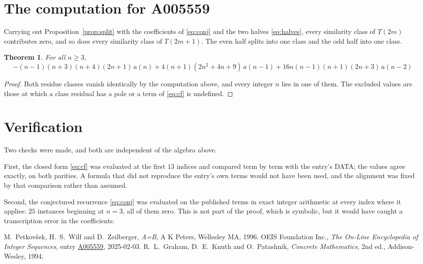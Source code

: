 \documentclass[11pt,a4paper]{article}
\theoremstyle{plain}
\newtheorem{theorem}{Theorem}
\theoremstyle{definition}
\begin{document}
\section{The computation for A005559}

Carrying out Proposition~\ref{prop:split} with the coefficients of \eqref{eq:conj} and the
two halves \eqref{eq:halves}, every similarity class of $T(2m)$ contributes zero, and so
does every similarity class of $T(2m+1)$. The even half splits into one class
and the odd half into one class.

\begin{theorem}
For all $n\ge 3$,
\[
- \left(n - 1\right) \left(n + 3\right) \left(n + 4\right) \left(2 n + 1\right)\,a(n) + 4 \left(n + 1\right) \left(2 n^{2} + 4 n + 9\right)\,a(n-1) + 16 n \left(n - 1\right) \left(n + 1\right) \left(2 n + 3\right)\,a(n-2)
\]
\end{theorem}

\begin{proof}
Both residue classes vanish identically by the computation above, and every integer $n$
lies in one of them. The excluded values are those at which a class residual has a pole or
a term of \eqref{eq:cf} is undefined.
\end{proof}

\section{Verification}

Two checks were made, and both are independent of the algebra above.

First, the closed form \eqref{eq:cf} was evaluated at the first $13$ indices and
compared term by term with the entry's DATA; the values agree exactly, on both parities. A
formula that did not reproduce the entry's own terms would not have been used, and the
alignment was fixed by that comparison rather than assumed.

Second, the conjectured recurrence \eqref{eq:conj} was evaluated on the published terms in
exact integer arithmetic at every index where it applies: $25$ instances beginning at
$n=3$, all of them zero. This is not part of the proof, which is symbolic, but it
would have caught a transcription error in the coefficients.

\begin{thebibliography}{9}
 M.~Petkov\v{s}ek, H.~S.~Wilf and D.~Zeilberger, \emph{A=B}, A K Peters,
Wellesley MA, 1996.
 OEIS Foundation Inc., \emph{The On-Line Encyclopedia of Integer Sequences},
entry \href{https://oeis.org/A005559}{A005559}, 2025-02-03.
 R.~L.~Graham, D.~E.~Knuth and O.~Patashnik, \emph{Concrete Mathematics},
2nd ed., Addison-Wesley, 1994.
\end{thebibliography}
\end{document}
